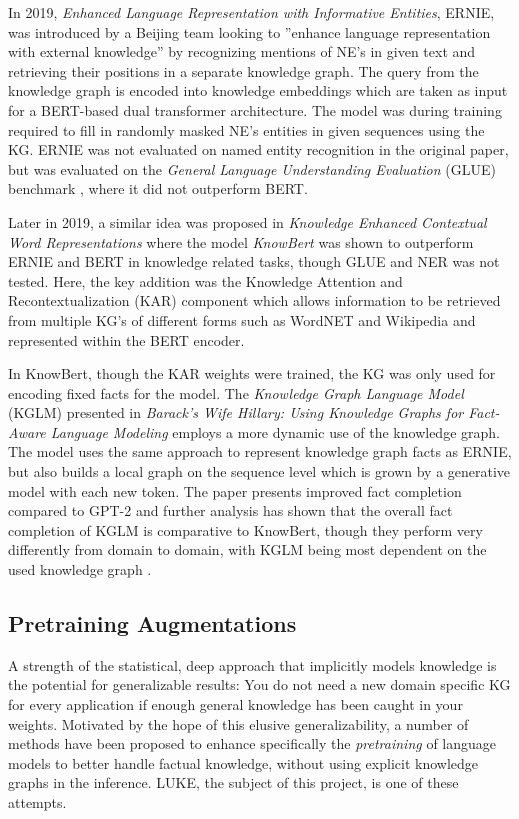 \documentclass[main.tex]{subfiles}
\begin{document}
In 2019, \emph{Enhanced Language Representation with Informative Entities}, ERNIE, was introduced by a Beijing team \cite{zhang2019ernie} looking to ''enhance language representation  with  external  knowledge'' \cite[1]{zhang2019ernie} by recognizing mentions of NE's in given text and retrieving their positions in a separate knowledge graph.
The query from the knowledge graph is encoded into knowledge embeddings which are taken as input for a BERT-based dual transformer architecture.
The model was during training required to fill in randomly masked NE's entities in given sequences using the KG.
ERNIE was not evaluated on named entity recognition in the original paper, but was evaluated on the \emph{General Language Understanding Evaluation} (GLUE) benchmark \cite{wang2018glue}, where it did not outperform BERT.

Later in 2019, a similar idea was proposed in \emph{Knowledge Enhanced Contextual Word Representations} where the model \emph{KnowBert} \cite{peters2019knowbert} was shown to outperform ERNIE and BERT in knowledge related tasks, though GLUE and NER was not tested.
Here, the key addition was the Knowledge Attention and Recontextualization (KAR) component which allows information to be retrieved from multiple KG's of different forms such as WordNET and Wikipedia and represented within the BERT encoder.

In KnowBert, though the KAR weights were trained, the KG was only used for encoding fixed facts for the model.
The \emph{Knowledge Graph Language Model} (KGLM) presented in \emph{Barack’s Wife Hillary: Using Knowledge Graphs for Fact-Aware Language Modeling} \cite{logan2019barack} employs a more dynamic use of the knowledge graph.
The model uses the same approach to represent knowledge graph facts as ERNIE, but also builds a local graph on the sequence level which is grown by a generative model with each new token.
The paper presents improved fact completion compared to GPT-2 and further analysis has shown that the overall fact completion of KGLM is comparative to KnowBert, though they perform very differently from domain to domain, with KGLM being most dependent on the used knowledge graph \cite{birk2020knowledge}.

\subsection{Pretraining Augmentations}
A strength of the statistical, deep approach that implicitly models knowledge is the potential for generalizable results:
You do not need a new domain specific KG for every application if enough general knowledge has been caught in your weights.
Motivated by the hope of this elusive generalizability, a number of methods have been proposed to enhance specifically the \emph{pretraining} of language models to better handle factual knowledge, without using explicit knowledge graphs in the inference.
LUKE, the subject of this project, is one of these attempts.
\end{document}
